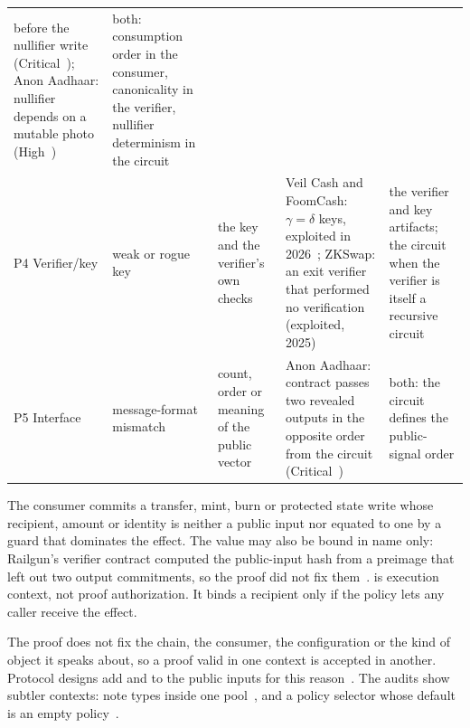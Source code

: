 \begin{table}[t]
\begin{tabular}{@{}p{1.5cm}p{2.1cm}p{3.3cm}p{5.8cm}p{3.6cm}@{}}
before the nullifier write (Critical~\cite{zellic-singularity}); Anon
Aadhaar: nullifier depends on a mutable photo
(High~\cite{pse-anonaadhaar}) &
both: consumption order in the consumer, canonicality in the verifier,
nullifier determinism in the circuit \\
P4 Verifier/key & weak or rogue key &
the key and the verifier's own checks &
Veil Cash and FoomCash: $\gamma=\delta$ keys, exploited in
2026~\cite{veil-poc,foomcash}; ZKSwap: an exit verifier that performed no
verification (exploited, 2025) &
the verifier and key artifacts; the circuit when the verifier is itself a
recursive circuit \\
P5 Interface & message-format mismatch &
count, order or meaning of the public vector &
Anon Aadhaar: contract passes two revealed outputs in the opposite order
from the circuit (Critical~\cite{pse-anonaadhaar}) &
both: the circuit defines the public-signal order \\
\bottomrule
\end{tabular}
\end{table}

The consumer commits a transfer, mint, burn or protected state write whose
recipient, amount or identity is neither a public input nor equated to one by
a guard that dominates the effect. The value may also be bound in name only:
Railgun's verifier contract computed the public-input hash from a preimage
that left out two output commitments, so the proof did not fix
them~\cite{abdk-railgun}.  is execution context, not proof
authorization. It binds a recipient only if the policy lets any caller
receive the effect.%

The proof does not fix the chain, the consumer, the configuration or the kind
of object it speaks about, so a proof valid in one context is accepted in
another. Protocol designs add  and  to the
public inputs for this reason~\cite{binding-design-2606}. The audits show
subtler contexts: note types inside one pool~\cite{zellic-singularity}, and a
policy selector whose default is an empty policy~\cite{zksecurity-self}.

